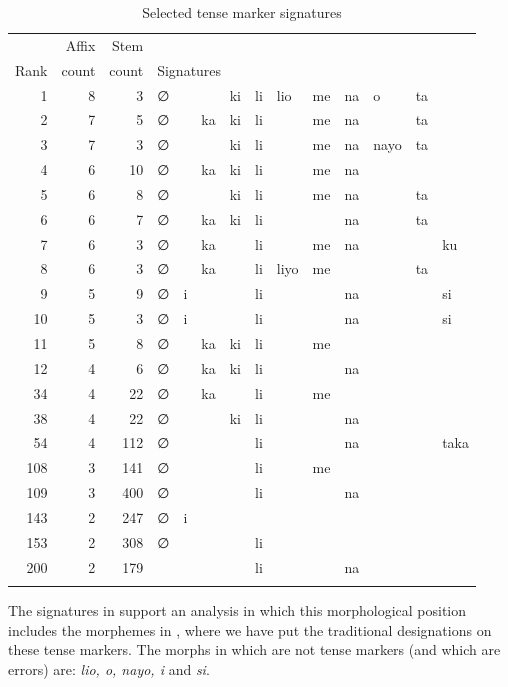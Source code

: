 \documentclass[output=paper,colorlinks,citecolor=brown]{langscibook}
\begin{document}
 
\begin{table}

\label{top-TM-sigs}
\begin{tabular}{rrr *{10}{l@{~~}}l}\lsptoprule
& Affix & Stem  &  \\
Rank & count & count &  \multicolumn{9}{l}{Signatures}  \\ \midrule
1 & 8 & 3 & ∅ &     && ki & li & lio & me & na & o  & ta  \\
2 &  7 & 5 & ∅ &&  ka & ki & li &     & me & na &    & ta  \\
3 &  7 & 3 & ∅ &&     & ki & li &     & me & na &  nayo &  ta \\
4 &  6 & 10& ∅ &&  ka & ki & li &     & me & na \\
5 &  6 &  8 & ∅ &&     & ki & li &      & me &  na &&   ta\\
6 &  6 & 7 & ∅ &&  ka & ki & li &     &    & na &  & ta \\
7 &  6 & 3 & ∅ &&  ka & & li &     & me &  na &&& ku \\
8 &  6 & 3 & ∅ &&  ka &    & li & liyo &  me &&&  ta\\
9 &  5 & 9 & ∅ &  i  &    && li &&&  na &&&  si\\
10 & 5 & 3 & ∅&  i  &    && li &&& na &&& si \\
11 & 5 & 8 & ∅ && ka & ki & li &     & me \\
12 & 4 & 6 & ∅ && ka & ki & li & & & na \\
34 & 4 &22 & ∅ &&  ka &    &li  & & me \\
38 & 4 &22 & ∅ &&     &  ki &  li  &&& na \\
54& 4 & 112 & ∅ &&     &    & li &&&  na  &&&  taka \\
108 & 3 & 141 & ∅ &&  & & li  && me \\
109 & 3 &  400 & ∅ && & &  li  &&& na  \\
143 & 2 &  247 & ∅ &  i \\
153 & 2 &  308 & ∅ &&  & & li \\
200 & 2 &179 &&   &  &  & li &&& na \\
  \lspbottomrule
\end{tabular}
\caption{Selected tense marker signatures}
\label{TM-sigs}
\end{table}
 

The signatures in  support an analysis in which this morphological position includes the morphemes in , where we have put the traditional designations on these tense markers. The morphs in  which are not tense markers (and which are errors) are: \textit{lio, o, nayo, i} and \textit{si}. 
 
\end{document}
